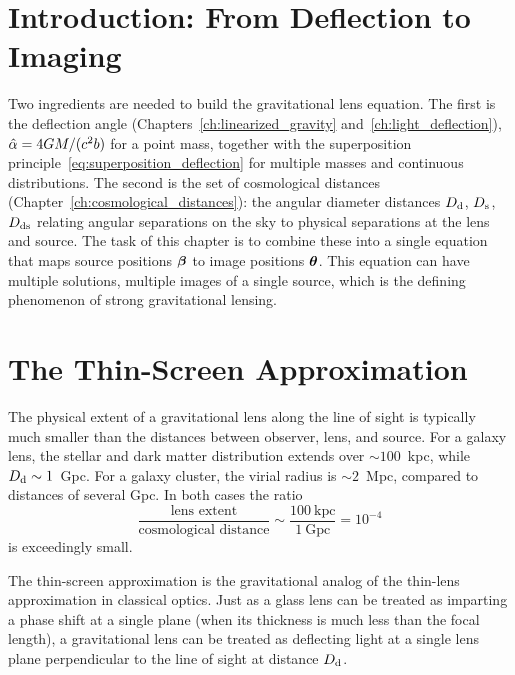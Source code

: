 \section{Introduction: From Deflection to Imaging}
\label{sec:lens_eq_intro}

Two ingredients are needed to build the gravitational lens equation.
The first is the deflection angle (Chapters~\ref{ch:linearized_gravity} and~\ref{ch:light_deflection}),
$\hat{\alpha} = 4G M / (c^2 b)$ for a point mass,
together with the superposition
principle~\eqref{eq:superposition_deflection} for multiple masses and
continuous distributions.  The second is the set of cosmological
distances (Chapter~\ref{ch:cosmological_distances}): the angular diameter
distances $D_{\mathrm{d}}$, $D_{\mathrm{s}}$, $D_{\mathrm{ds}}$ relating angular separations on the sky to
physical separations at the lens and source.  The task of this chapter is
to combine these into a single equation that maps source positions
$\boldsymbol{\beta}$ to image positions $\boldsymbol{\theta}$.  This equation can have
multiple solutions, multiple images of a single source, which is the
defining phenomenon of strong gravitational lensing.


\section{The Thin-Screen Approximation}
\label{sec:thin_screen}

The physical extent of a gravitational lens along the line of sight is
typically much smaller than the distances between observer, lens, and
source.  For a galaxy lens, the stellar and dark matter distribution
extends over $\sim 100$~kpc, while $D_{\mathrm{d}} \sim 1$~Gpc.  For a galaxy
cluster, the virial radius is $\sim 2$~Mpc, compared to distances of
several Gpc.  In both cases the ratio
\begin{equation}
    \frac{\text{lens extent}}{\text{cosmological distance}}
    \sim \frac{100~\text{kpc}}{1~\text{Gpc}} = 10^{-4}
    \label{eq:thin_screen_ratio}
\end{equation}
is exceedingly small.

\begin{remark}
The thin-screen approximation is the gravitational analog of the
thin-lens approximation in classical optics.  Just as a glass
lens can be treated as imparting a phase shift at a single plane
(when its thickness is much less than the focal length), a
gravitational lens can be treated as deflecting light at a single
lens plane perpendicular to the line of sight at distance
$D_{\mathrm{d}}$.
\end{remark}

